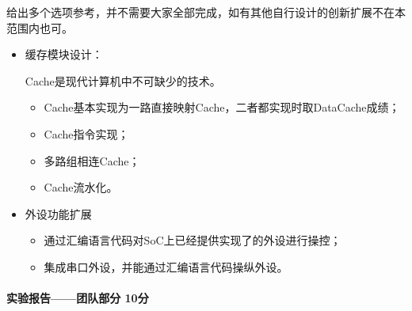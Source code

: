 给出多个选项参考，并不需要大家全部完成，如有其他自行设计的创新扩展不在本范围内也可。

\begin{itemize}
    \item 缓存模块设计：
    
    Cache是现代计算机中不可缺少的技术。

    \begin{itemize}
        \item Cache基本实现为一路直接映射Cache，二者都实现时取DataCache成绩；
        \item Cache指令实现；
        \item 多路组相连Cache；
        \item Cache流水化。
    \end{itemize}
    \item 外设功能扩展
    \begin{itemize}
        \item 通过汇编语言代码对SoC上已经提供实现了的外设进行操控；
        \item 集成串口外设，并能通过汇编语言代码操纵外设。
    \end{itemize}
\end{itemize}

\paragraph{实验报告——团队部分 10分}



